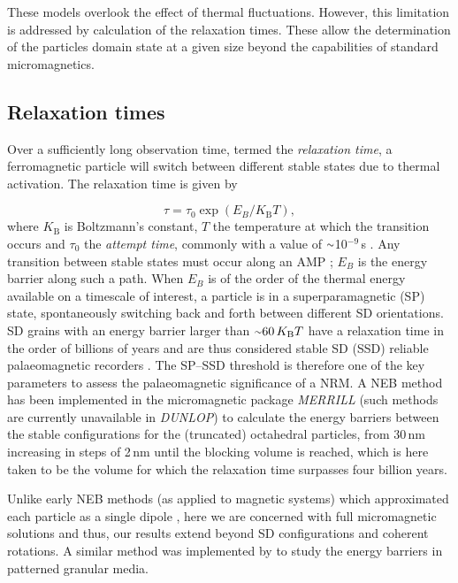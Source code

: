\documentclass[review,authoryear]{elsarticle}
\newcommand{\roughly}{{\raise.17ex\hbox{$\scriptstyle\sim$}}}
\newcommand{\nm}{\,\text{nm}}
\begin{document}
These models overlook the effect of thermal fluctuations. However, this limitation is addressed by calculation of the relaxation times. These allow the determination of the particles domain state at a given size beyond the capabilities of standard micromagnetics.\par

\subsection{Relaxation times}
Over a sufficiently long observation time, termed the \textit{relaxation time}, a ferromagnetic particle will switch between different stable states due to thermal activation. The relaxation time is given by \citep{Neel1955}
{\par\nobreak\noindent}
\begin{equation}\label{neel}
\tau = \tau_0 \exp\left(E_{B}/K_{\text{B}}T\right),
\end{equation}
where $K_{\text{B}}$ is Boltzmann's constant, $T$ the temperature at which the transition occurs and $\tau_0$ the \textit{attempt time}, commonly with a value of $\roughly$10$^{-9}\,$s \citep{McNab1968}. Any transition between stable states must occur along an AMP \citep{Fabian2017}; $E_B$ is the energy barrier along such a path. When $E_B$ is of the order of the thermal energy available on a timescale of interest, a particle is in a superparamagnetic (SP) state, spontaneously switching back and forth between different SD orientations. SD grains with an energy barrier larger than $\roughly60\,K_\text{B}T$ have a relaxation time in the order of billions of years and are thus considered stable SD (SSD) reliable palaeomagnetic recorders \citep{Dunlop}. The SP--SSD threshold is therefore one of the key parameters to assess the palaeomagnetic significance of a NRM. A NEB method \citep{Fabian2017} has been implemented in the micromagnetic package \textit{MERRILL} \citep{Nagy2017} (such methods are currently unavailable in \textit{DUNLOP}) to calculate the energy barriers between the stable configurations for the (truncated) octahedral particles, from 30$\nm$ increasing in steps of 2$\nm$ until the blocking volume is reached, which is here taken to be the volume for which the relaxation time surpasses four billion years.\par

Unlike early NEB methods (as applied to magnetic systems) which approximated each particle as a single dipole \citep{Berkov1998}, here we are concerned with full micromagnetic solutions and thus, our results extend beyond SD configurations and coherent rotations. A similar method was implemented by \citet{Dittrich2002} to study the energy barriers in patterned granular media.\par
\end{document}
